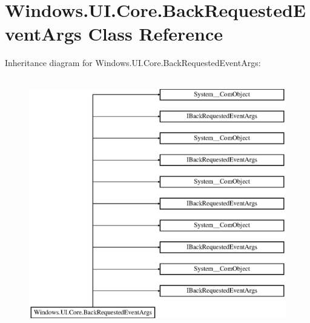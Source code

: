 \hypertarget{class_windows_1_1_u_i_1_1_core_1_1_back_requested_event_args}{}\section{Windows.\+U\+I.\+Core.\+Back\+Requested\+Event\+Args Class Reference}
\label{class_windows_1_1_u_i_1_1_core_1_1_back_requested_event_args}
Inheritance diagram for Windows.\+U\+I.\+Core.\+Back\+Requested\+Event\+Args\+:\begin{figure}[H]
\begin{center}
\leavevmode
\includegraphics[height=11.000000cm]{class_windows_1_1_u_i_1_1_core_1_1_back_requested_event_args}
\end{center}
\end{figure}
